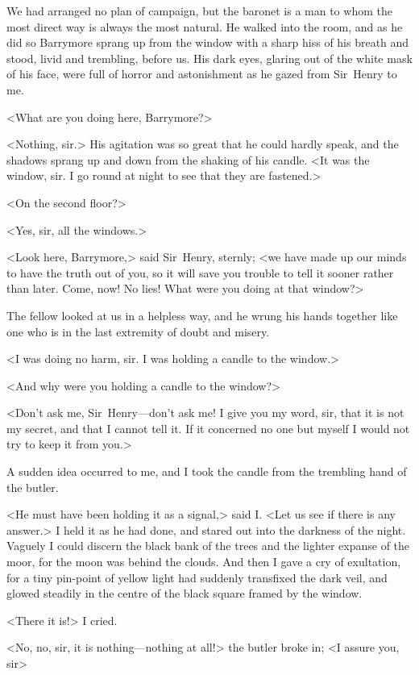 We had arranged no plan of campaign, but the baronet is a man to whom the most direct way is always the most natural. He walked into the room, and as he did so Barrymore sprang up from the window with a sharp hiss of his breath and stood, livid and trembling, before us. His dark eyes, glaring out of the white mask of his face, were full of horror and astonishment as he gazed from Sir~Henry to me.

<What are you doing here, Barrymore?>

<Nothing, sir.> His agitation was so great that he could hardly speak, and the shadows sprang up and down from the shaking of his candle. <It was the window, sir. I go round at night to see that they are fastened.>

<On the second floor?>

<Yes, sir, all the windows.>

<Look here, Barrymore,> said Sir~Henry, sternly; <we have made up our minds to have the truth out of you, so it will save you trouble to tell it sooner rather than later. Come, now! No lies! What were you doing at that window?>

The fellow looked at us in a helpless way, and he wrung his hands together like one who is in the last extremity of doubt and misery.

<I was doing no harm, sir. I was holding a candle to the window.>

<And why were you holding a candle to the window?>

<Don't ask me, Sir~Henry—don't ask me! I give you my word, sir, that it is not my secret, and that I cannot tell it. If it concerned no one but myself I would not try to keep it from you.>

A sudden idea occurred to me, and I took the candle from the trembling hand of the butler.

<He must have been holding it as a signal,> said I\@. <Let us see if there is any answer.> I held it as he had done, and stared out into the darkness of the night. Vaguely I could discern the black bank of the trees and the lighter expanse of the moor, for the moon was behind the clouds. And then I gave a cry of exultation, for a tiny pin-point of yellow light had suddenly transfixed the dark veil, and glowed steadily in the centre of the black square framed by the window.

<There it is!> I cried.

<No, no, sir, it is nothing—nothing at all!> the butler broke in; <I assure you, sir\longdash>

